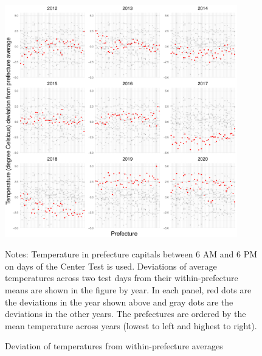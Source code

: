 \documentclass[12pt,letterpaper]{article}
\begin{document}
\begin{figure}[H]
  \centering
  \caption{Deviation of temperatures from within-prefecture averages}
  \includegraphics[width = 0.9\textwidth]{../Output/images/temperature_diff_by_year.pdf}
  \label{fig:temperature_diff_by_year}
  \footnotesize
  \begin{tablenotes}
    \item Notes:
      Temperature in prefecture capitals between 6 AM and 6 PM on days of the Center Test is used.
      Deviations of average temperatures across two test days from their within-prefecture means are shown in the figure by year.
      In each panel, red dots are the deviations in the year shown above and gray dots are the deviations in the other years.
      The prefectures are ordered by the mean temperature across years (lowest to left and highest to right).
  \end{tablenotes}
\end{figure}

  
\end{document}
